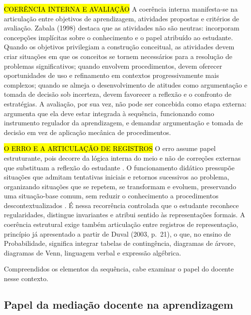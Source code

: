 {\hl {COERÊNCIA INTERNA E AVALIAÇÃO} A coerência interna manifesta-se na articulação entre objetivos de aprendizagem, atividades propostas e critérios de avaliação. Zabala (1998) destaca que as atividades não são neutras: incorporam concepções implícitas sobre o conhecimento e o papel atribuído ao estudante. Quando os objetivos privilegiam a construção conceitual, as atividades devem criar situações em que os conceitos se tornem necessários para a resolução de problemas significativos; quando envolvem procedimentos, devem oferecer oportunidades de uso e refinamento em contextos progressivamente mais complexos; quando se almeja o desenvolvimento de atitudes como argumentação e tomada de decisão sob incerteza, devem favorecer a reflexão e o confronto de estratégias. A avaliação, por sua vez, não pode ser concebida como etapa externa:  argumenta que ela deve estar integrada à sequência, funcionando como instrumento regulador da aprendizagem, e demandar argumentação e tomada de decisão em vez de aplicação mecânica de procedimentos.

\hl {O ERRO E A ARTICULAÇÃO DE REGISTROS} O erro assume papel estruturante, pois decorre da lógica interna do meio e não de correções externas que substituam a reflexão do estudante \cite[p.~88]{brousseau1997}. O funcionamento didático pressupõe situações que admitam tentativas iniciais e retornos sucessivos ao problema, organizando situações que se repetem, se transformam e evoluem, preservando uma situação-base comum, sem reduzir o conhecimento a procedimentos descontextualizados \cite[p.~31, p.~231]{brousseau1997}. É nessa recorrência controlada que o estudante reconhece regularidades, distingue invariantes e atribui sentido às representações formais. A coerência estrutural exige também articulação entre registros de representação, princípio já apresentado a partir de Duval (2003, p.~21), o que, no ensino de Probabilidade, significa integrar tabelas de contingência, diagramas de árvore, diagramas de Venn, linguagem verbal e expressão algébrica.

Compreendidos os elementos da sequência, cabe examinar o papel do docente nesse contexto.

\subsection{Papel da mediação docente na aprendizagem}

}
